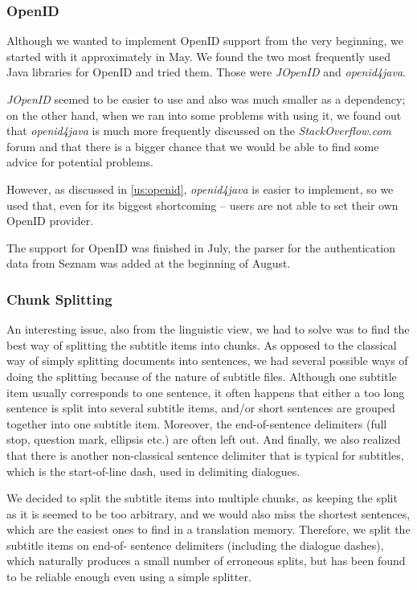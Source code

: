 \subsubsection{OpenID}
\label{subsubsec:openid}

Although we wanted to implement OpenID support from the very beginning, 
we started with it approximately in May. We found the two most frequently 
used Java libraries for OpenID and tried them. Those were \emph{JOpenID} 
and \emph{openid4java}.

\emph{JOpenID} seemed to be easier to use and also was much smaller as a 
dependency; on the other hand, when we ran into some problems with using 
it, we found out that \emph{openid4java} is much more frequently 
discussed on the \emph{StackOverflow.com} forum and that there is a 
bigger chance that we would be able to find some advice for potential 
problems. 

However, as discussed in \ref{us:openid}, \emph{openid4java} is easier to implement, so we used that, even for its biggest shortcoming -- users are not able to set their own OpenID provider.

The support for OpenID was finished in July, the parser for the authentication data from Seznam was added at the beginning of August.

\subsubsection{Chunk Splitting}

An interesting issue, also from the linguistic view, we had to solve was to find the best way of splitting the subtitle items into chunks. As opposed to the classical way of simply splitting documents into sentences, we had several possible ways of doing the splitting because of the nature of subtitle files.
Although one subtitle item usually corresponds to one sentence, it often happens that either a too long sentence is split into several subtitle items, and/or short sentences are grouped together into one subtitle item. Moreover, the end-of-sentence delimiters (full stop, question mark, ellipsis etc.) are often left out.
And finally, we also realized that there is another non-classical sentence delimiter that is typical for subtitles, which is the start-of-line dash, used in delimiting dialogues.

We decided to split the subtitle items into multiple chunks,
as keeping the split as it is seemed to be too arbitrary, and we would 
also miss the shortest sentences, which are the easiest ones to find in a 
translation memory. Therefore, we split the subtitle items on end-of-
sentence delimiters (including the dialogue dashes), which naturally 
produces a small number of erroneous splits, but has been found to be 
reliable enough even using a simple splitter.


